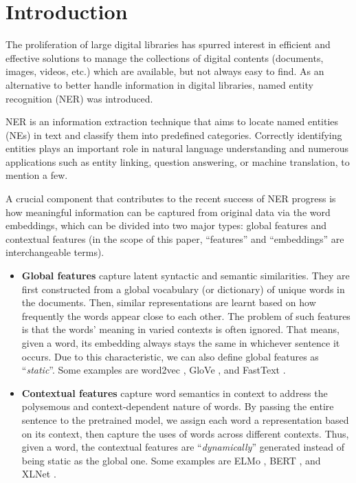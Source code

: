 \documentclass[runningheads]{llncs}
\begin{document}
\section{Introduction}

The proliferation of large digital libraries has spurred interest in efficient and effective solutions to manage the collections of digital contents (documents, images, videos, etc.) which are available, but not always easy to find. As an alternative to better handle information in digital libraries, named entity recognition (NER) was introduced.



NER is an information extraction technique that aims to locate named entities (NEs) in text and classify them into predefined categories. Correctly identifying entities plays an important role in natural language understanding and numerous applications such as entity linking, question answering, or machine translation, to mention a few.



A crucial component that contributes to the recent success of NER progress is how meaningful information can be captured from original data via the word embeddings, which can be divided into two major types: global features and contextual features (in the scope of this paper, ``features'' and ``embeddings'' are interchangeable terms).
\begin{itemize}
    \item \textbf{Global features} \cite{pennington2014glove} capture latent syntactic and semantic similarities. They are first constructed from a global vocabulary (or dictionary) of unique words in the documents. Then, similar representations are learnt based on how frequently the words appear close to each other. The problem of such features is that the words' meaning in varied contexts is often ignored. That means, given a word, its embedding always stays the same in whichever sentence it occurs. Due to this characteristic, we can also define global features as ``\textit{static}''. Some examples are word2vec \cite{church2017word2vec}, GloVe \cite{pennington2014glove}, and FastText \cite{joulin2016fasttext}.

    \item \textbf{Contextual features} \cite{devlin2019bert} capture word semantics in context to address the polysemous and context-dependent nature of words. By passing the entire sentence to the pretrained model, we assign each word a representation based on its context, then capture the uses of words across different contexts. Thus, given a word, the contextual features are ``\textit{dynamically}'' generated instead of being static as the global one. Some examples are ELMo \cite{peters2018deep}, BERT \cite{devlin2019bert}, and XLNet \cite{yang2019xlnet}. \end{itemize}
\end{document}
